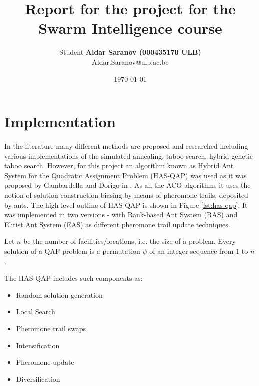\documentclass[12pt]{article}
\author{Student \textbf{Aldar Saranov (000435170 ULB)} \\ Aldar.Saranov@ulb.ac.be}
\date{\today}
\title{Report for the project for the Swarm Intelligence course}
\begin{document}
\maketitle
\newpage


\section{Implementation}

In the literature many different methods are proposed and researched including various implementations of the simulated annealing, taboo search, hybrid genetic-taboo search. However, for this project an algorithm known as Hybrid Ant System for the Quadratic Assignment Problem (HAS-QAP) was used as it was proposed by Gambardella and Dorigo in \cite{Gambardella}. As all the ACO algorithms it uses the notion of solution construction biasing by means of pheromone trails, deposited by ants. The high-level outline of HAS-QAP is shown in Figure \ref{lst:has-qap}. It was implemented in two versions - with Rank-based Ant System (RAS) and Elitist Ant System (EAS) as different pheromone trail update techniques.

Let $n$ be the number of facilities/locations, i.e. the size of a problem. Every solution of a QAP problem is a permutation $\psi$ of an integer sequence from $1$ to $n$.

The HAS-QAP includes such components as:

\begin{itemize}
\item Random solution generation
\item Local Search
\item Pheromone trail swaps
\item Intensification
\item Pheromone update
\item Diversification
\end{itemize}
\end{document}

